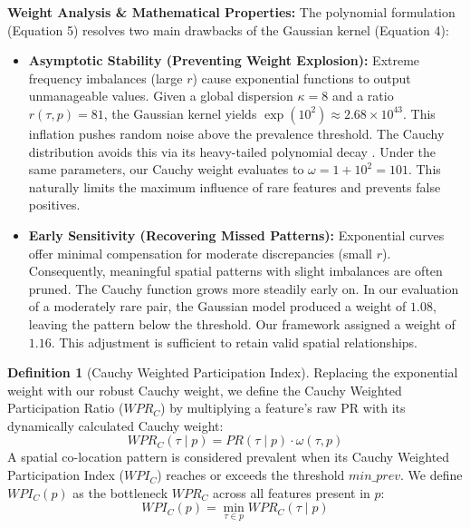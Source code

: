 \documentclass[12pt, letterpaper]{template}
\theoremstyle{definition}
\newtheorem{definition}{Definition}
\begin{document}
\vspace{0.5em}
\noindent \textbf{Weight Analysis \& Mathematical Properties:} The polynomial formulation (Equation 5) resolves two main drawbacks of the Gaussian kernel (Equation 4):
\begin{itemize}
\item \textbf{Asymptotic Stability (Preventing Weight Explosion):} Extreme frequency imbalances (large $r$) cause exponential functions to output unmanageable values. Given a global dispersion $\kappa = 8$ and a ratio $r(\tau,p) = 81$, the Gaussian kernel yields $\exp(10^2) \approx 2.68 \times 10^{43}$. This inflation pushes random noise above the prevalence threshold. The Cauchy distribution avoids this via its heavy-tailed polynomial decay \cite{lu2018mining}. Under the same parameters, our Cauchy weight evaluates to $\omega = 1 + 10^2 = 101$. This naturally limits the maximum influence of rare features and prevents false positives.
    
    \item \textbf{Early Sensitivity (Recovering Missed Patterns):} Exponential curves offer minimal compensation for moderate discrepancies (small $r$). Consequently, meaningful spatial patterns with slight imbalances are often pruned. The Cauchy function grows more steadily early on. In our evaluation of a moderately rare pair, the Gaussian model produced a weight of $1.08$, leaving the pattern below the threshold. Our framework assigned a weight of $1.16$. This adjustment is sufficient to retain valid spatial relationships.
\end{itemize}

\begin{definition}[Cauchy Weighted Participation Index]
Replacing the exponential weight with our robust Cauchy weight, we define the Cauchy Weighted Participation Ratio (${WPR}_{{C}}$) by multiplying a feature's raw PR with its dynamically calculated Cauchy weight:
\begin{equation}
{WPR}_{{C}}(\tau \mid p) = {PR}(\tau \mid p) \cdot \omega(\tau,p)
\end{equation}
A spatial co-location pattern is considered prevalent when its Cauchy Weighted Participation Index ($WPI_C$) reaches or exceeds the threshold $min\_prev$. We define $WPI_C(p)$ as the bottleneck $WPR_C$ across all features present in $p$:
\begin{equation}
{WPI}_{{C}}(p) = \min_{\tau\in p}{WPR}_{{C}}(\tau \mid p)
\end{equation}
\end{definition}
\end{document}
